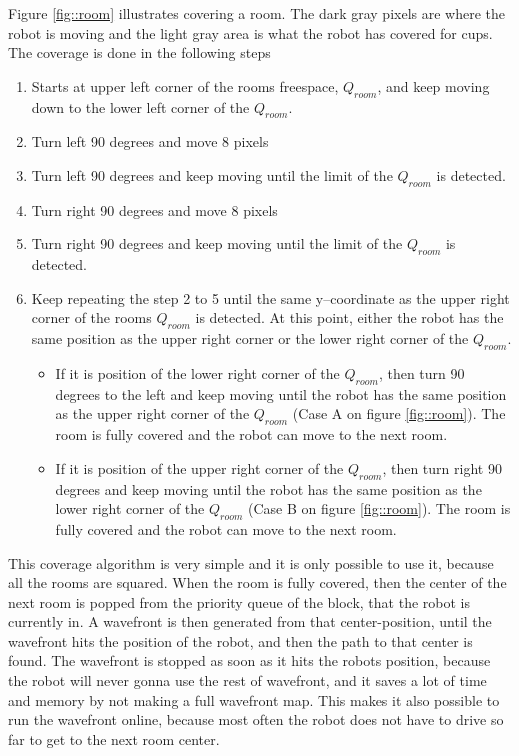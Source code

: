 Figure \ref{fig::room} illustrates covering a room. The dark gray pixels are where the robot is moving and the light gray area is what the robot has covered for cups. The coverage is done in the following steps
\begin{enumerate}\itemsep-2pt
\item Starts at upper left corner of the rooms freespace, $Q_{room}$, and keep moving down to the lower left corner of the $Q_{room}$.
\item Turn left 90 degrees and move 8 pixels
\item Turn left 90 degrees and keep moving until the limit of the $Q_{room}$ is detected.
\item Turn right 90 degrees and move 8 pixels
\item Turn right 90 degrees and keep moving until the limit of the $Q_{room}$ is detected.
\item Keep repeating the step 2 to 5 until the same y--coordinate as the upper right corner of the rooms $Q_{room}$ is detected. At this point, either the robot has the same position as the upper right corner or the lower right corner of the $Q_{room}$.    
\begin{itemize}\itemsep-2pt  
\item If it is position of the lower right corner of the $Q_{room}$, then turn 90 degrees to the left and keep moving until the robot has the same position as the upper right corner of the $Q_{room}$ (Case A on figure \ref{fig::room}). The room is fully covered and the robot can move to the next room. 
\item If it is position of the upper right corner of the $Q_{room}$, then turn right 90 degrees and keep moving until the robot has the same position as the lower right corner of the $Q_{room}$ (Case B on figure \ref{fig::room}). The room is fully covered and the robot can move to the next room. 
\end{itemize}
\end{enumerate} 
This coverage algorithm is very simple and it is only possible to use it, because all the rooms are squared. When the room is fully covered, then the center of the next room is popped from the priority queue of the block, that the robot is currently in. A wavefront is then generated from that center-position, until the wavefront hits the position of the robot, and then the path to that center is found. The wavefront is stopped as soon as it hits the robots position, because the robot will never gonna use the rest of wavefront, and it saves a lot of time and memory by not making a full wavefront map. This makes it also possible to run the wavefront online, because most often the robot does not have to drive so far to get to the next room center. 

